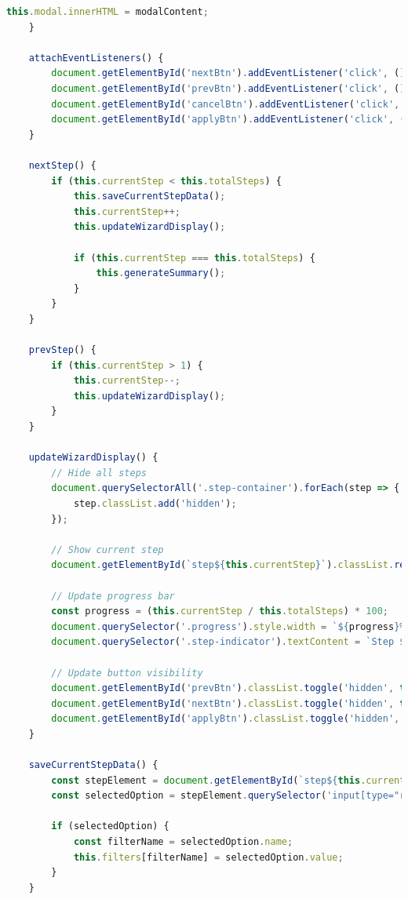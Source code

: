 \documentclass[11pt,a4paper]{article}
\begin{document}
\begin{lstlisting}[language=JavaScript, caption=Filter-Wizard Implementation]
        this.modal.innerHTML = modalContent;
    }
    
    attachEventListeners() {
        document.getElementById('nextBtn').addEventListener('click', () => this.nextStep());
        document.getElementById('prevBtn').addEventListener('click', () => this.prevStep());
        document.getElementById('cancelBtn').addEventListener('click', () => this.close());
        document.getElementById('applyBtn').addEventListener('click', () => this.applyFilters());
    }
    
    nextStep() {
        if (this.currentStep < this.totalSteps) {
            this.saveCurrentStepData();
            this.currentStep++;
            this.updateWizardDisplay();
            
            if (this.currentStep === this.totalSteps) {
                this.generateSummary();
            }
        }
    }
    
    prevStep() {
        if (this.currentStep > 1) {
            this.currentStep--;
            this.updateWizardDisplay();
        }
    }
    
    updateWizardDisplay() {
        // Hide all steps
        document.querySelectorAll('.step-container').forEach(step => {
            step.classList.add('hidden');
        });
        
        // Show current step
        document.getElementById(`step${this.currentStep}`).classList.remove('hidden');
        
        // Update progress bar
        const progress = (this.currentStep / this.totalSteps) * 100;
        document.querySelector('.progress').style.width = `${progress}%`;
        document.querySelector('.step-indicator').textContent = `Step ${this.currentStep} of ${this.totalSteps}`;
        
        // Update button visibility
        document.getElementById('prevBtn').classList.toggle('hidden', this.currentStep === 1);
        document.getElementById('nextBtn').classList.toggle('hidden', this.currentStep === this.totalSteps);
        document.getElementById('applyBtn').classList.toggle('hidden', this.currentStep !== this.totalSteps);
    }
    
    saveCurrentStepData() {
        const stepElement = document.getElementById(`step${this.currentStep}`);
        const selectedOption = stepElement.querySelector('input[type="radio"]:checked');
        
        if (selectedOption) {
            const filterName = selectedOption.name;
            this.filters[filterName] = selectedOption.value;
        }
    }
    

\end{lstlisting}
\end{document}

